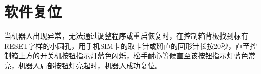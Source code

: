 \chapter{软件复位}

当机器人出现异常，无法通过调整程序或重启恢复时，在控制箱背板找到标有{\sf RESET}字样的小圆孔，用手机SIM卡的取卡针或掰直的回形针长按20秒，直至控制箱上方的开关机按钮指示灯蓝色闪烁，松手耐心等候直至该按钮指示灯蓝色常亮，机器人肩部按钮灯亮起时，机器人成功复位。

